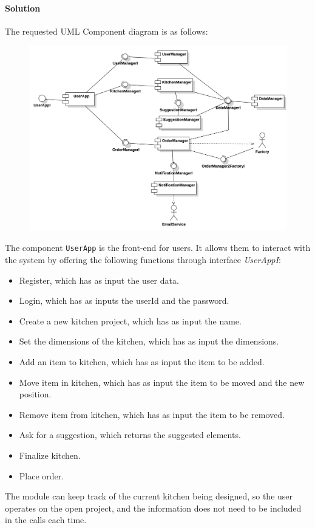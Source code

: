 \paragraph*{Solution}
The requested UML Component diagram is as follows: 
\begin{figure}[H]
    \centering
    \includegraphics[width=0.9\linewidth]{images/cd.png}
\end{figure}

The component \texttt{UserApp} is the front-end for users. 
It allows them to interact with the system by offering the following functions through interface \textit{UserAppI}:
\begin{itemize}
    \item Register, which has as input the user data. 
    \item Login, which has as inputs the userId and the password.
    \item Create a new kitchen project, which has as input the name. 
    \item Set the dimensions of the kitchen, which has as input the dimensions.
    \item Add an item to kitchen, which has as input the item to be added.
    \item Move item in kitchen, which has as input the item to be moved and the new position.
    \item Remove item from kitchen, which has as input the item to be removed.
    \item Ask for a suggestion, which returns the suggested elements.
    \item Finalize kitchen.
    \item Place order.
\end{itemize}
The module can keep track of the current kitchen being designed, so the user operates on the open project, and the information does not need to be included in the calls each time.

